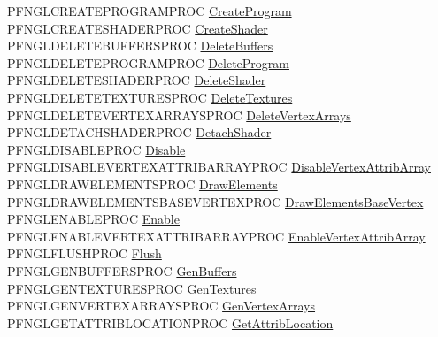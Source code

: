 \begin{DoxyCompactItemize}
\begin{tabbing}
\>PFNGLCREATEPROGRAMPROC \hyperlink{unionGL3WProcs_ab453b1a27c54b03d6d8d5eab94acfdd9}{CreateProgram}\\
\>PFNGLCREATESHADERPROC \hyperlink{unionGL3WProcs_a3a66c71fa393f2eddd16192f5675fae8}{CreateShader}\\
\>PFNGLDELETEBUFFERSPROC \hyperlink{unionGL3WProcs_a3be9651ae3b0d38a41f47d6ba037d088}{DeleteBuffers}\\
\>PFNGLDELETEPROGRAMPROC \hyperlink{unionGL3WProcs_ae6a798bb90df0799f2ef9f030b1dfa08}{DeleteProgram}\\
\>PFNGLDELETESHADERPROC \hyperlink{unionGL3WProcs_a271e26392c79c6ecf896df75f38064c8}{DeleteShader}\\
\>PFNGLDELETETEXTURESPROC \hyperlink{unionGL3WProcs_a856ff0792a211d2a5a4ccf1a94d75cbc}{DeleteTextures}\\
\>PFNGLDELETEVERTEXARRAYSPROC \hyperlink{unionGL3WProcs_afacb4828e16d94f950e836e4b454a416}{DeleteVertexArrays}\\
\>PFNGLDETACHSHADERPROC \hyperlink{unionGL3WProcs_a1220dc93f4623c94111f892622f5ca62}{DetachShader}\\
\>PFNGLDISABLEPROC \hyperlink{unionGL3WProcs_ac144930662e8e0d04d2169f098583b28}{Disable}\\
\>PFNGLDISABLEVERTEXATTRIBARRAYPROC \hyperlink{unionGL3WProcs_acd197c1e133c71189c44ade37aa79d54}{DisableVertexAttribArray}\\
\>PFNGLDRAWELEMENTSPROC \hyperlink{unionGL3WProcs_a4a4b2180a54475eb5ec3f3ea5ce7c4d3}{DrawElements}\\
\>PFNGLDRAWELEMENTSBASEVERTEXPROC \hyperlink{unionGL3WProcs_a73ac7502a8c8bbdfcca3de301daa68b4}{DrawElementsBaseVertex}\\
\>PFNGLENABLEPROC \hyperlink{unionGL3WProcs_aaeaaa0ddd0a9554437682724694988e4}{Enable}\\
\>PFNGLENABLEVERTEXATTRIBARRAYPROC \hyperlink{unionGL3WProcs_a95108e8f79aca72223d19ea9877529d4}{EnableVertexAttribArray}\\
\>PFNGLFLUSHPROC \hyperlink{unionGL3WProcs_aa2467ca005d7ad5fccdc2b0394190379}{Flush}\\
\>PFNGLGENBUFFERSPROC \hyperlink{unionGL3WProcs_a3b65a7d91db863d8f17270ade0e7e175}{GenBuffers}\\
\>PFNGLGENTEXTURESPROC \hyperlink{unionGL3WProcs_a39fbccf86a733c5bb8518a9b808b89f5}{GenTextures}\\
\>PFNGLGENVERTEXARRAYSPROC \hyperlink{unionGL3WProcs_aac111f14e7afd68e8dd71a380058a1fe}{GenVertexArrays}\\
\>PFNGLGETATTRIBLOCATIONPROC \hyperlink{unionGL3WProcs_a5f23fd14bae4d40f155864dba3dace6f}{GetAttribLocation}\\

\end{tabbing}
\end{DoxyCompactItemize}

